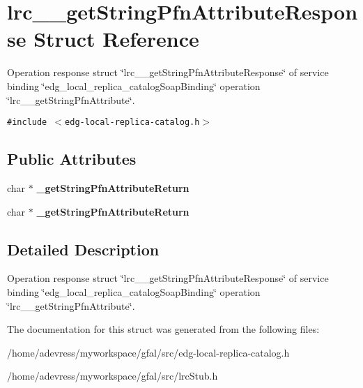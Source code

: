 \section{lrc\_\-\_\-get\-String\-Pfn\-Attribute\-Response Struct Reference}
\label{structlrc____getStringPfnAttributeResponse}
Operation response struct \char`\"{}lrc\_\-\_\-get\-String\-Pfn\-Attribute\-Response\char`\"{} of service binding \char`\"{}edg\_\-local\_\-replica\_\-catalog\-Soap\-Binding\char`\"{} operation \char`\"{}lrc\_\-\_\-get\-String\-Pfn\-Attribute\char`\"{}.  


{\tt \#include $<$edg-local-replica-catalog.h$>$}

\subsection*{Public Attributes}
\begin{CompactItemize}
\item 
char $\ast$ \textbf{\_\-get\-String\-Pfn\-Attribute\-Return}\label{structlrc____getStringPfnAttributeResponse_8dfe2586bfe2d25e41b6c4255b046dcc}

\item 
char $\ast$ \textbf{\_\-get\-String\-Pfn\-Attribute\-Return}\label{structlrc____getStringPfnAttributeResponse_8dfe2586bfe2d25e41b6c4255b046dcc}

\end{CompactItemize}


\subsection{Detailed Description}
Operation response struct \char`\"{}lrc\_\-\_\-get\-String\-Pfn\-Attribute\-Response\char`\"{} of service binding \char`\"{}edg\_\-local\_\-replica\_\-catalog\-Soap\-Binding\char`\"{} operation \char`\"{}lrc\_\-\_\-get\-String\-Pfn\-Attribute\char`\"{}. 



The documentation for this struct was generated from the following files:\begin{CompactItemize}
\item 
/home/adevress/myworkspace/gfal/src/edg-local-replica-catalog.h\item 
/home/adevress/myworkspace/gfal/src/lrc\-Stub.h\end{CompactItemize}
